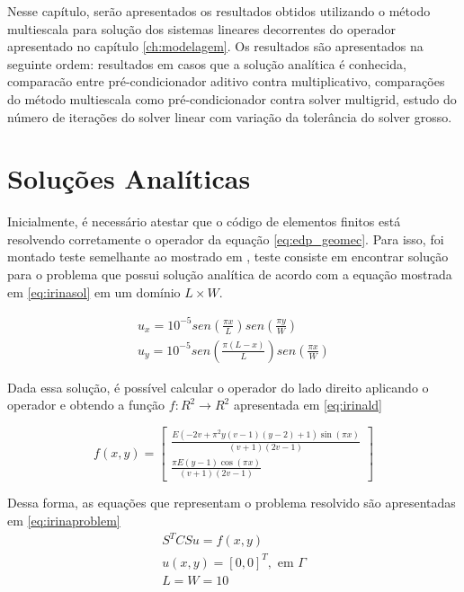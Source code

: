 Nesse capítulo, serão apresentados os resultados obtidos utilizando o método multiescala para solução dos sistemas lineares decorrentes do operador apresentado no capítulo \ref{ch:modelagem}. Os resultados são apresentados na seguinte ordem: resultados em casos que a solução analítica é conhecida,
comparacão entre pré-condicionador aditivo contra multiplicativo, comparações do método multiescala como pré-condicionador contra solver multigrid,
 estudo do número de iterações do solver linear com variação da tolerância do solver grosso.



\section{Soluções Analíticas}

Inicialmente, é necessário atestar que o código de elementos finitos está resolvendo corretamente o operador da equação \ref{eq:edp_geomec}. 
Para isso, foi montado teste semelhante ao mostrado em \cite{irina}, teste consiste em encontrar solução para o problema que possui solução analítica de acordo com a equação mostrada em \ref{eq:irinasol} 
em um domínio $L \times W$.


\begin{equation} \label{eq:irinasol}
  \begin{aligned}
  u_x = 10^{-5} sen(\frac{\pi x}{L}) sen(\frac{\pi y}{W})  \\
  u_y = 10^{-5} sen(\frac{\pi (L-x)}{L}) sen(\frac{\pi x}{W})
  \end{aligned}
\end{equation}

Dada essa solução, é possível calcular o operador do lado direito aplicando o operador e obtendo a função $f: R^2 \rightarrow R^2$ apresentada em \ref{eq:irinald}

\begin{equation} \label{eq:irinald}
f(x, y) = 
\left[\begin{matrix}\frac{E \left(- 2 v + \pi^{2} y \left(v - 1\right) \left(y - 2\right) + 1\right) \sin{\left (\pi x \right )}}{\left(v + 1\right) \left(2 v - 1\right)} \\ \frac{\pi E \left(y - 1\right) \cos{\left (\pi x \right )}}{\left(v + 1\right) \left(2 v - 1\right)}\end{matrix}\right]
\end{equation}

Dessa forma, as equações que representam o problema resolvido são apresentadas em \ref{eq:irinaproblem}
\begin{equation}\label{eq:irinaproblem}
    \begin{aligned}
        S^T C S u = f(x, y) \\
        u(x,y) = [0, 0]^T, \text{ em } \Gamma \\
        L = W = 10
    \end{aligned}
\end{equation}


